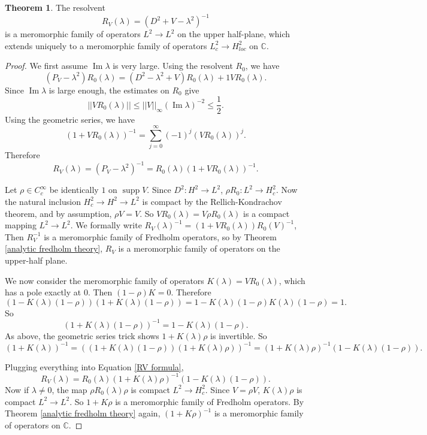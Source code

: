 \documentclass[12pt]{report}
\newcommand{\CC}{\mathbb{C}}
\newcommand{\supp}{\operatorname{supp}}
\renewcommand{\Im}{\operatorname{Im}}
\theoremstyle{definition}
\newtheorem{theorem}{Theorem}[chapter]
\begin{document}
\begin{defintion}
\begin{theorem}
The resolvent
$$R_V(\lambda) = (D^2 + V - \lambda^2)^{-1}$$
is a meromorphic family of operators $L^2 \to L^2$ on the upper half-plane, which extends uniquely to a meromorphic family of operators $L^2_c \to H^2_{loc}$ on $\CC$.
\end{theorem}
\begin{proof}
We first assume $\Im \lambda$ is very large. Using the resolvent $R_0$, we have
$$(P_V - \lambda^2)R_0(\lambda) = (D^2 - \lambda^2 + V) R_0(\lambda) + 1 VR_0(\lambda).$$
Since $\Im \lambda$ is large enough, the estimates on $R_0$ give
$$||VR_0(\lambda)|| \leq ||V||_\infty (\Im \lambda)^{-2} \leq \frac{1}{2}.$$
Using the geometric series, we have
$$(1 + VR_0(\lambda))^{-1} = \sum_{j=0}^\infty (-1)^j (VR_0(\lambda))^j.$$
Therefore
\begin{equation}
\label{RV formula}
R_V(\lambda) = (P_V - \lambda^2)^{-1} = R_0(\lambda)(1 + VR_0(\lambda))^{-1}.
\end{equation}

Let $\rho \in C^\infty_c$ be identically $1$ on $\supp V$. Since $D^2: H^2 \to L^2$, $\rho R_0: L^2 \to H^2_c$. Now the natural inclusion $H^2_c \to H^2 \to L^2$ is compact by the Rellich-Kondrachov theorem, and by assumption, $\rho V = V$. So $VR_0(\lambda) = V\rho R_0(\lambda)$ is a compact mapping $L^2 \to L^2$. We formally write $R_V(\lambda)^{-1} = (1+VR_0(\lambda))R_0(V)^{-1}$, Then $R_V^{-1}$ is a meromorphic family of Fredholm operators, so by Theorem \ref{analytic fredholm theory}, $R_V$ is a meromorphic family of operators on the upper-half plane.

We now consider the meromorphic family of operators $K(\lambda) = VR_0(\lambda)$, which has a pole exactly at $0$. Then $(1-\rho)K = 0$. Therefore
$$(1 - K(\lambda)(1 - \rho))(1 + K(\lambda)(1 - \rho)) = 1 - K(\lambda)(1 - \rho)K(\lambda)(1 - \rho) = 1.$$
So
$$(1 + K(\lambda)(1 - \rho))^{-1} = 1 - K(\lambda)(1 - \rho).$$
As above, the geometric series trick shows $1 + K(\lambda)\rho$ is invertible. So
$$(1 + K(\lambda))^{-1} = ((1+ K(\lambda)(1 - \rho))(1 + K(\lambda)\rho))^{-1} = (1 + K(\lambda)\rho)^{-1}(1 - K(\lambda)(1 - \rho)).$$

Plugging everything into Equation \ref{RV formula},
$$R_V(\lambda) = R_0(\lambda)(1 + K(\lambda)\rho)^{-1}(1 - K(\lambda)(1 - \rho)).$$
Now if $\lambda \neq 0$, the map $\rho R_0(\lambda) \rho$ is compact $L^2 \to H^2_c$. Since $V = \rho V$, $K(\lambda)\rho$ is compact $L^2 \to L^2$. So $1 + K\rho$ is a meromorphic family of Fredholm operators. By Theorem \ref{analytic fredholm theory} again, $(1 + K\rho)^{-1}$ is a meromorphic family of operators on $\CC$.


\end{proof}
\end{defintion}
\end{document}
